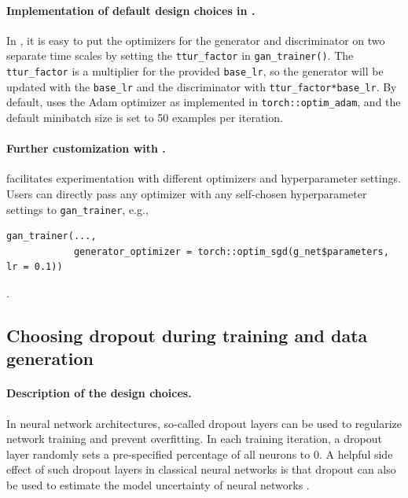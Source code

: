 \paragraph{\texorpdfstring{Implementation of default design choices in .}{Implementation of default design choices in .}}\label{implementation-of-default-design-choices-in-.-3}

In , it is easy to put the optimizers for the generator and discriminator on two separate time scales by setting the \texttt{ttur\_factor} in \texttt{gan\_trainer()}. The \texttt{ttur\_factor} is a multiplier for the provided \texttt{base\_lr}, so the generator will be updated with the \texttt{base\_lr} and the discriminator with \texttt{ttur\_factor*base\_lr}. By default,  uses the Adam optimizer \citep{adam} as implemented in \texttt{torch::optim\_adam}, and the default minibatch size is set to 50 examples per iteration.

\paragraph{\texorpdfstring{Further customization with .}{Further customization with .}}\label{further-customization-with-.-3}

 facilitates experimentation with different optimizers and hyperparameter settings. Users can directly pass any  optimizer with any self-chosen hyperparameter settings to \texttt{gan\_trainer}, e.g.,

\begin{verbatim}
gan_trainer(..., 
            generator_optimizer = torch::optim_sgd(g_net$parameters, lr = 0.1))
\end{verbatim}

.

\subsection{Choosing dropout during training and data generation}\label{sec:dropout}

\paragraph{Description of the design choices.}\label{description-of-the-design-choices.-4}

In neural network architectures, so-called dropout layers \citep{srivastava2014dropout} can be used to regularize network training and prevent overfitting. In each training iteration, a dropout layer randomly sets a pre-specified percentage of all neurons to 0. A helpful side effect of such dropout layers in classical neural networks is that dropout can also be used to estimate the model uncertainty of neural networks \citep{gal2016dropout}.

